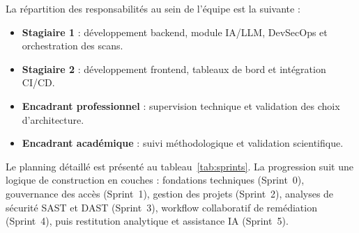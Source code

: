La répartition des responsabilités au sein de l'équipe est la suivante :

\begin{itemize}
  \item \textbf{Stagiaire 1} : développement backend, module IA/LLM, DevSecOps et
  orchestration des scans.
  \item \textbf{Stagiaire 2} : développement frontend, tableaux de bord et intégration
  CI/CD.
  \item \textbf{Encadrant professionnel} : supervision technique et validation des
  choix d'architecture.
  \item \textbf{Encadrant académique} : suivi méthodologique et validation scientifique.
\end{itemize}

Le planning détaillé est présenté au tableau~\ref{tab:sprints}. La progression suit
une logique de construction en couches : fondations techniques (Sprint~0), gouvernance des
accès (Sprint~1), gestion des projets (Sprint~2), analyses de sécurité SAST et DAST (Sprint~3),
workflow collaboratif de remédiation (Sprint~4), puis restitution analytique et assistance IA (Sprint~5).

